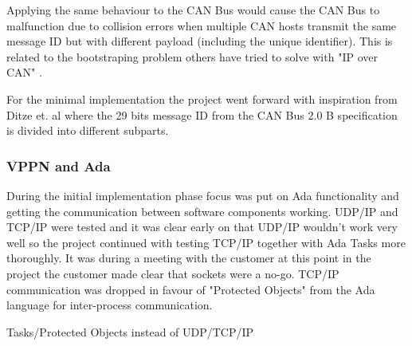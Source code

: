 Applying the same behaviour to the CAN Bus would cause the CAN Bus to
malfunction due to collision errors when multiple CAN hosts transmit the same
message ID but with different payload (including the unique identifier).
This is related to the bootstraping problem others have tried to solve with
"IP over CAN" \cite{ietf:ip_over_can, web:porting_ip_can}.

For the minimal implementation the project went forward with inspiration from
Ditze et. al \cite{web:porting_ip_can} where the 29 bits message ID from the
CAN Bus 2.0 B specification is divided into different subparts.

\subsubsection{VPPN and Ada}
During the initial implementation phase focus was put on Ada functionality and
getting the communication between software components working. UDP/IP and TCP/IP
were tested and it was clear early on that UDP/IP wouldn't work very well so
the project continued with testing TCP/IP together with Ada Tasks more
thoroughly. It was during a meeting with the customer at this point in the
project the customer made clear that sockets were a no-go. TCP/IP communication
was dropped in favour of "Protected Objects" from the Ada language for
inter-process communication.

Tasks/Protected Objects instead of UDP/TCP/IP

%
